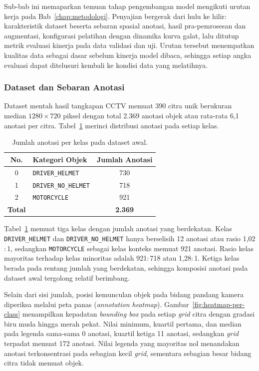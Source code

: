 Sub-bab ini memaparkan temuan tahap pengembangan model mengikuti urutan kerja pada Bab~\ref{chap:metodologi}. Penyajian bergerak dari hulu ke hilir: karakteristik dataset beserta sebaran spasial anotasi, hasil pra-pemrosesan dan augmentasi, konfigurasi pelatihan dengan dinamika kurva galat, lalu ditutup metrik evaluasi kinerja pada data validasi dan uji. Urutan tersebut menempatkan kualitas data sebagai dasar sebelum kinerja model dibaca, sehingga setiap angka evaluasi dapat ditelusuri kembali ke kondisi data yang melatihnya.

\subsubsection{Dataset dan Sebaran Anotasi}
\label{subsubsec:hasil-eda}

Dataset mentah hasil tangkapan CCTV memuat 390 citra unik berukuran median $1280 \times 720$ piksel dengan total 2.369 anotasi objek atau rata-rata 6,1 anotasi per citra. Tabel~\ref{tab:distribusi-objek} merinci distribusi anotasi pada setiap kelas.

\begin{table}[htbp]
  \centering
  \caption{Jumlah anotasi per kelas pada dataset awal.}
  \label{tab:distribusi-objek}
  \begin{tabular}{clc}
    \hline
    \textbf{No.} & \textbf{Kategori Objek} & \textbf{Jumlah Anotasi} \\
    \hline
    0 & \texttt{DRIVER\_HELMET}     & 730 \\
    1 & \texttt{DRIVER\_NO\_HELMET} & 718 \\
    2 & \texttt{MOTORCYCLE}         & 921 \\
    \hline
    \textbf{Total} & & \textbf{2.369} \\
    \hline
  \end{tabular}
\end{table}

Tabel~\ref{tab:distribusi-objek} memuat tiga kelas dengan jumlah anotasi yang berdekatan. Kelas \texttt{DRIVER\_HELMET} dan \texttt{DRIVER\_NO\_HELMET} hanya berselisih 12 anotasi atau rasio 1{,}02$:$1, sedangkan \texttt{MOTORCYCLE} sebagai kelas konteks memuat 921 anotasi. Rasio kelas mayoritas terhadap kelas minoritas adalah 921$:$718 atau 1{,}28$:$1. Ketiga kelas berada pada rentang jumlah yang berdekatan, sehingga komposisi anotasi pada dataset awal tergolong relatif berimbang.

Selain dari sisi jumlah, posisi kemunculan objek pada bidang pandang kamera diperiksa melalui peta panas (\textit{annotation heatmap}). Gambar~\ref{fig:heatmap-per-class} menampilkan kepadatan \textit{bounding box} pada setiap \textit{grid} citra dengan gradasi biru muda hingga merah pekat. Nilai minimum, kuartil pertama, dan median pada legenda sama-sama 0 anotasi, kuartil ketiga 11 anotasi, sedangkan \textit{grid} terpadat memuat 172 anotasi. Nilai legenda yang mayoritas nol menandakan anotasi terkonsentrasi pada sebagian kecil \textit{grid}, sementara sebagian besar bidang citra tidak memuat objek.


